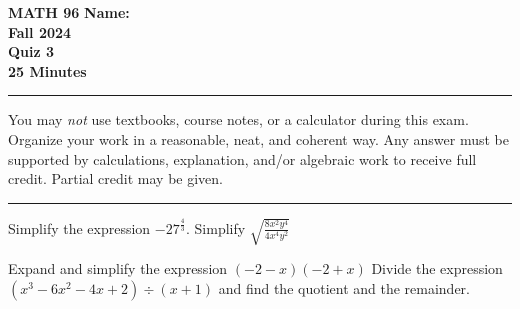 \documentclass[11pt]{exam}
\begin{document}
\pagestyle{empty}
\textbf{MATH 96}  \textbf{Name:} \makebox[2.77in]{\hrulefill}\\
\textbf{Fall 2024} \\
\textbf{Quiz 3}\\
\textbf{25 Minutes}   

\rule[1ex]{\textwidth}{.1pt}
You may \emph{not} use textbooks, course notes, or a calculator during this exam. Organize your work in a reasonable, neat, and coherent way.  Any answer must be supported by calculations, explanation, and/or algebraic work to receive full credit. Partial credit may be given.
\vspace{5pt}\\
\rule[1ex]{\textwidth}{.1pt}
\noprintanswers
\begin{questions}
\vspace{-10pt}

\question[8] Simplify the expression $-27^{\frac{4}{3}}$. 
\vspace{3.1in}
\question[8] Simplify $\displaystyle \sqrt{ \frac{8x^2y^4}{4x^4 y^2} }$

\newpage
\question[6] Expand and simplify the expression $(-2-x)(-2+x)$
\vspace{3.1in}
\question[8] Divide the expression $(x^3-6x^2-4x+2)\div (x+1)$ and find the quotient and the remainder.

\end{questions}
\end{document}
